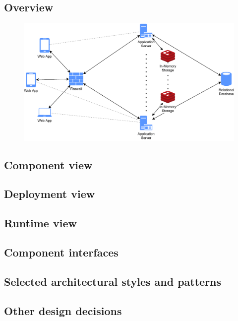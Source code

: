 \subsection{Overview}

\begin{figure}[h]
    \centering
    \includegraphics[width=.85\textwidth]{Images/overview.pdf}
    \caption{\label{fig:world_machine} }
\end{figure}


\subsection{Component view}

\subsection{Deployment view}

\subsection{Runtime view}

\subsection{Component interfaces}

\subsection{Selected architectural styles and patterns}

\subsection{Other design decisions}
